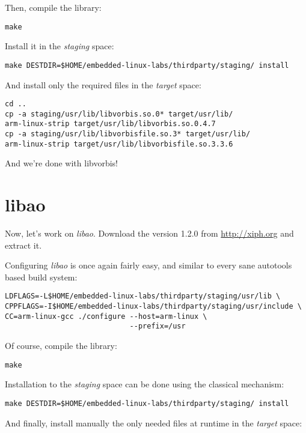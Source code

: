 Then, compile the library:

\begin{verbatim}
make
\end{verbatim}

Install it in the {\em staging} space:

\begin{verbatim}
make DESTDIR=$HOME/embedded-linux-labs/thirdparty/staging/ install
\end{verbatim}

And install only the required files in the {\em target} space:

\begin{verbatim}
cd ..
cp -a staging/usr/lib/libvorbis.so.0* target/usr/lib/
arm-linux-strip target/usr/lib/libvorbis.so.0.4.7
cp -a staging/usr/lib/libvorbisfile.so.3* target/usr/lib/
arm-linux-strip target/usr/lib/libvorbisfile.so.3.3.6
\end{verbatim}

And we're done with libvorbis!

\section{libao}

Now, let's work on {\em libao}. Download the version 1.2.0 from
\url{http://xiph.org} and extract it.

Configuring {\em libao} is once again fairly easy, and similar to
every sane autotools based build system:

\begin{verbatim}
LDFLAGS=-L$HOME/embedded-linux-labs/thirdparty/staging/usr/lib \
CPPFLAGS=-I$HOME/embedded-linux-labs/thirdparty/staging/usr/include \
CC=arm-linux-gcc ./configure --host=arm-linux \
                             --prefix=/usr
\end{verbatim}

Of course, compile the library:

\begin{verbatim}
make
\end{verbatim}

Installation to the {\em staging} space can be done using the
classical  mechanism:

\begin{verbatim}
make DESTDIR=$HOME/embedded-linux-labs/thirdparty/staging/ install
\end{verbatim}

And finally, install manually the only needed files at runtime in the
{\em target} space:

